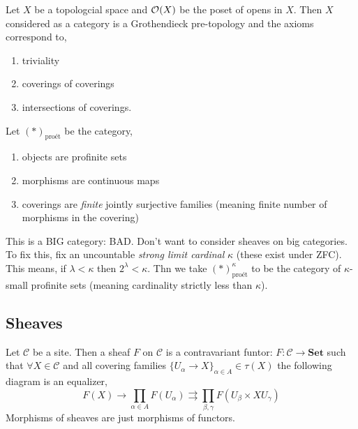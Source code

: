 \documentclass[12pt]{article}
\newcommand{\proet}{\text{pro\'{e}t}}
\newcommand{\Set}{\mathbf{Set}}
\newcommand{\cC}{\mathcal{C}}
\begin{document}
\begin{example}
Let $X$ be a topologcial space and $\mathcal{O}_{}(X)$ be the poset of opens in $X$. Then $X$ considered as a category is a Grothendieck pre-topology and the axioms correspond to,
\begin{enumerate}
\item triviality
\item coverings of coverings
\item intersections of coverings.
\end{enumerate}
\end{example}

\begin{example}
Let $(*)_{\proet}$ be the category,
\begin{enumerate}
\item objects are profinite sets

\item morphisms are continuous maps

\item coverings are \textit{finite} jointly surjective families (meaning finite number of morphisms in the covering)
\end{enumerate}
\end{example}

\begin{rmk}
This is a BIG category: BAD. Don't want to consider sheaves on big categories. To fix this, fix an uncountable \textit{strong limit cardinal} $\kappa$ (these exist under ZFC). This means, if $\lambda < \kappa$ then $2^\lambda < \kappa$. Thn we take $(*)_{\proet}^\kappa$ to be the category of $\kappa$-small profinite sets (meaning cardinality strictly less than $\kappa$). 
\end{rmk}

\subsection{Sheaves}

\begin{defn}
Let $\cC$ be a site. Then a sheaf $F$ on $\cC$ is a contravariant funtor: $F : \cC \to \Set$ such that $\forall X \in \cC$ and all covering families $\{ U_\alpha \to X \}_{\alpha \in A} \in \tau(X)$ the following diagram is an equalizer,
\[ F(X) \to \prod_{\alpha \in A} F(U_\alpha) \rightrightarrows \prod_{\beta, \gamma} F(U_\beta \times X U_\gamma) \]
Morphisms of sheaves are just morphisms of functors.
\end{defn}
\end{document}
